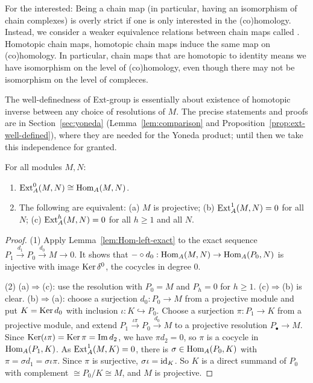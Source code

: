 \begin{supplementary}
For the interested:  
Being a chain map (in particular, having an isomorphism of chain complexes) is overly strict if one is only interested in the (co)homology.  Instead, we consider a weaker equivalence relations between chain maps called .  Homotopic chain maps, homotopic chain maps induce the same map on (co)homology.
In particular, chain maps that are homotopic to identity means we have isomorphism on the level of (co)homology, even though there may not be isomorphism on the level of compleces.

The well-definedness of Ext-group is essentially about existence of homotopic inverse between any choice of resolutions of $M$.
The precise statements and proofs are in Section~\ref{sec:yoneda} (Lemma~\ref{lem:comparison} and Proposition~\ref{prop:ext-well-defined}), where they are needed for the Yoneda product; until then we take this independence for granted.
\end{supplementary}

\begin{proposition}\label{prop:ext-basic}
For all modules $M,N$:
\begin{enumerate}
\item $\operatorname{Ext}\nolimits_A^0(M,N)\cong\operatorname{Hom}\nolimits_A(M,N)$.
\item The following are equivalent: (a) $M$ is projective; (b) $\operatorname{Ext}\nolimits_A^1(M,N)=0$ for all $N$; (c) $\operatorname{Ext}\nolimits_A^h(M,N)=0$ for all $h\geq1$ and all $N$.
\end{enumerate}
\end{proposition}

\begin{proof}
(1) Apply Lemma~\ref{lem:Hom-left-exact} to the exact sequence $P_1\xrightarrow{d_1}P_0\xrightarrow{d_0}M\to0$.
It shows that $-\circ d_0:\operatorname{Hom}\nolimits_A(M,N)\to\operatorname{Hom}\nolimits_A(P_0,N)$ is injective with image $\operatorname{Ker}\nolimits\delta^0$, the cocycles in degree $0$.

(2) (a)$\Rightarrow$(c): use the resolution with $P_0=M$ and $P_h=0$ for $h\geq1$.
(c)$\Rightarrow$(b) is clear.
(b)$\Rightarrow$(a): choose a surjection $d_0:P_0\to M$ from a projective module and put $K=\operatorname{Ker}\nolimits d_0$ with inclusion $\iota:K\hookrightarrow P_0$.
Choose a surjection $\pi:P_1\to K$ from a projective module, and extend $P_1\xrightarrow{\iota\pi}P_0\xrightarrow{d_0}M$ to a projective resolution $P_\bullet\to M$.
Since $\operatorname{Ker}\nolimits(\iota\pi)=\operatorname{Ker}\nolimits\pi=\operatorname{Im}\nolimits d_2$, we have $\pi d_2=0$, so $\pi$ is a cocycle in $\operatorname{Hom}\nolimits_A(P_1,K)$.
As $\operatorname{Ext}\nolimits_A^1(M,K)=0$, there is $\sigma\in\operatorname{Hom}\nolimits_A(P_0,K)$ with $\pi=\sigma d_1=\sigma\iota\pi$.
Since $\pi$ is surjective, $\sigma\iota=\operatorname{id}_K$.
So $K$ is a direct summand of $P_0$ with complement $\cong P_0/K\cong M$, and $M$ is projective.
\end{proof}

